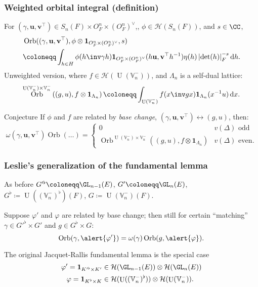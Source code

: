 \documentclass[11pt]{beamer}
\DeclareMathOperator{\Orb}{Orb}
\DeclareMathOperator{\U}{U}
\newcommand{\HH}{\mathcal{H}}
\newcommand{\VV}{\mathbb{V}}
\renewcommand{\OO}{O}
\newcommand{\guv}{{(\gamma, \uu, \vv^\top)}}
\newcommand{\uu}{\mathbf{u}}
\newcommand{\vv}{\mathbf{v}}
\newcommand{\oneV}{\mathbf{1}_{\OO_F^n \times (\OO_F^n)^\vee}}
\begin{document}
\begin{frame}
  \frametitle{Weighted orbital integral (definition)}
  For $\guv \in S_n(F) \times \OO_F^n \times (\OO_F^n)^\vee$,,
  $\phi \in \HH(S_n(F))$, and $s \in \CC$,
  \begin{align*}
    & \Orb((\gamma, \uu, \vv^\top), \phi \otimes \oneV, s) \\
    &\coloneqq \int_{h \in H} \phi(h\inv \gamma h) \oneV(h \uu, \vv^\top h^{-1})
    \eta(h) \left\lvert \det(h) \right\rvert_F^{-s} \odif h.
  \end{align*}
  Unweighted version, where $f \in \HH(\U(\VV_n^-))$,
  and $\Lambda_n$ is a self-dual lattice:
  \[
    \Orb^{\U(\VV_n^-) \times \VV_n^-}\left( (g,u), f \otimes \mathbf{1}_{\Lambda_n} \right)
    \coloneqq \int_{\U(\VV_n^-)} f(x\inv g x) \mathbf{1}_{\Lambda_n}(x^{-1} u) \odif x.
  \]
  \begin{exampleblock}{Conjecture}
    If $\phi$ and $f$ are related by \emph{base change},
    $\guv \longleftrightarrow (g,u)$, then:
    \[ \omega\guv \Orb(\dots)
      =
      \begin{cases}
        0 & v(\Delta) \text{ odd} \\
        \Orb^{\U(\VV_n^-) \times \VV_n^-}\left( (g,u), f \otimes \mathbf{1}_{\Lambda_n} \right)
        & v(\Delta) \text{ even}.
      \end{cases}
    \]
  \end{exampleblock}
\end{frame}


\begin{frame}
  \frametitle{Leslie's generalization of the fundamental lemma}
  As before $G'^\flat \coloneqq \GL_{n-1}(E)$, $G' \coloneqq \GL_n(E)$,
  $G^\flat \coloneqq \U((\VV_n^-)^\flat)(F)$, $G \coloneqq \U(\VV_n^-)(F)$.
  \begin{theorem}[Leslie 2023]
    Suppose \alert{$\varphi'$ and $\varphi$ are related by base change}; then still
    for certain ``matching'' $\gamma \in G'^\flat \times G'$ and $g \in G^\flat \times G$:
    \[ \Orb(\gamma, \alert{\varphi'}) = \omega(\gamma) \Orb(g, \alert{\varphi}). \]
  \end{theorem}
  The original Jacquet-Rallis fundamental lemma is the special case
  \begin{align*}
    \varphi' = \mathbf{1}_{K'^\flat \times K'} &\in \HH(\GL_{n-1}(E)) \otimes \HH(\GL_n(E)) \\
    \varphi = \mathbf{1}_{K^\flat \times K} &\in \HH(\U((\VV_n^-)^\flat)) \otimes \HH(\U(\VV_n^-)).
  \end{align*}
\end{frame}
\end{document}
